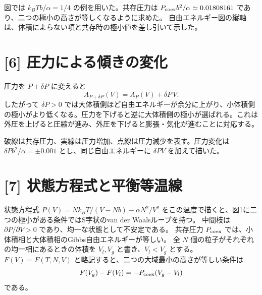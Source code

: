 \documentclass[11pt,a4paper]{article}
\begin{document}
図では $k_BT b/\alpha=1/4$ の例を用いた。共存圧力は
$P_{\rm coex}b^2/\alpha\simeq0.01808161$ であり、二つの極小の高さが等しくなるように求めた。
自由エネルギー図の縦軸は、体積によらない項と共存時の極小値を差し引いて示した。

\section*{[6] 圧力による傾きの変化}
圧力を $P+\delta P$ に変えると
\begin{equation}
 A_{P+\delta P}(V)=A_P(V)+\delta P\,V.
\end{equation}
したがって $\delta P>0$ では大体積側ほど自由エネルギーが余分に上がり、小体積側の極小がより低くなる。圧力を下げると逆に大体積側の極小が選ばれる。これは外圧を上げると圧縮が進み、外圧を下げると膨張・気化が進むことに対応する。
\begin{center}
\end{center}
破線は共存圧力、実線は圧力増加、点線は圧力減少を表す。圧力変化は $\delta P b^2/\alpha=\pm0.001$ とし、同じ自由エネルギーに $\delta P V$ を加えて描いた。

\section*{[7] 状態方程式と平衡等温線}
状態方程式 $P(V)=Nk_BT/(V-Nb)-\alpha N^2/V^2$ をこの温度で描くと、図1に二つの極小がある条件ではS字状のvan der Waalsループを持つ。
中間枝は $\partial P/\partial V>0$ であり、均一な状態として不安定である。
共存圧力 $P_{\rm coex}$ では、小体積相と大体積相のGibbs自由エネルギーが等しい。
全 $N$ 個の粒子がそれぞれの均一相にあるときの体積を $V_l,V_g$ と書き、$V_l<V_g$ とする。
$F(V)=F(T,N,V)$ と略記すると、二つの大域最小の高さが等しい条件は
\begin{equation}
 F(V_g)-F(V_l)=-P_{\rm coex}(V_g-V_l)
\end{equation}
である。
\end{document}
